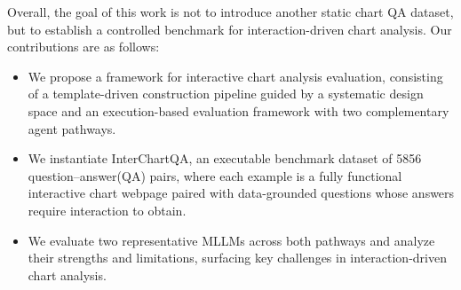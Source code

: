 \documentclass[review,journal,hideappendix]{vgtc} %
\begin{document}
Overall, the goal of this work is not to introduce another static chart QA dataset, but to establish a controlled benchmark for interaction-driven chart analysis. Our contributions are as follows:
\begin{itemize}[leftmargin=*]
    \item We propose a framework for interactive chart analysis evaluation, consisting of a template-driven construction pipeline guided by a systematic design space and an execution-based evaluation framework with two complementary agent pathways.
    \item We instantiate InterChartQA, an executable benchmark dataset of 5856 question–answer(QA) pairs, where each example is a fully functional interactive chart webpage paired with data-grounded questions whose answers require interaction to obtain.
    \item We evaluate two representative MLLMs across both pathways and analyze their strengths and limitations, surfacing key challenges in interaction-driven chart analysis.
\end{itemize}

\end{document}
